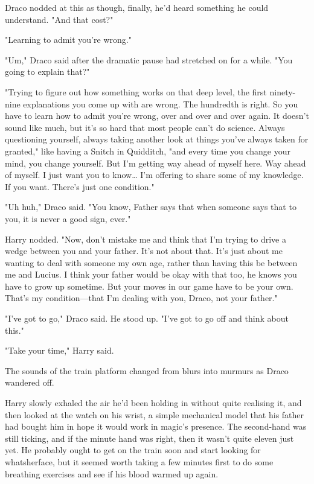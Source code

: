 Draco nodded at this as though, finally, he'd heard something he could 
understand. "And that cost?"

"Learning to admit you're wrong."

"Um," Draco said after the dramatic pause had stretched on for a while. "You 
going to explain that?"

"Trying to figure out how something works on that deep level, the first 
ninety-nine explanations you come up with are wrong. The hundredth is right. So 
you have to learn how to admit you're wrong, over and over and over again. It 
doesn't sound like much, but it's so hard that most people can't do science. 
Always questioning yourself, always taking another look at things you've always 
taken for granted," like having a Snitch in Quidditch, "and every time you 
change your mind, you change yourself. But I'm getting way ahead of myself 
here. Way ahead of myself. I just want you to know{\ldots} I'm offering to 
share some of my knowledge. If you want. There's just one condition."

"Uh huh," Draco said. "You know, Father says that when someone says that to 
you, it is never a good sign, ever."

Harry nodded. "Now, don't mistake me and think that I'm trying to drive a wedge 
between you and your father. It's not about that. It's just about me wanting to 
deal with someone my own age, rather than having this be between me and Lucius. 
I think your father would be okay with that too, he knows you have to grow up 
sometime. But your moves in our game have to be your own. That's my 
condition---that I'm dealing with you, Draco, not your father."

"I've got to go," Draco said. He stood up. "I've got to go off and think about 
this."

"Take your time," Harry said.

The sounds of the train platform changed from blurs into murmurs as Draco 
wandered off.

Harry slowly exhaled the air he'd been holding in without quite realising it, 
and then looked at the watch on his wrist, a simple mechanical model that his 
father had bought him in hope it would work in magic's presence. The 
second-hand was still ticking, and if the minute hand was right, then it wasn't 
quite eleven just yet. He probably ought to get on the train soon and start 
looking for whatsherface, but it seemed worth taking a few minutes first to do 
some breathing exercises and see if his blood warmed up again.

